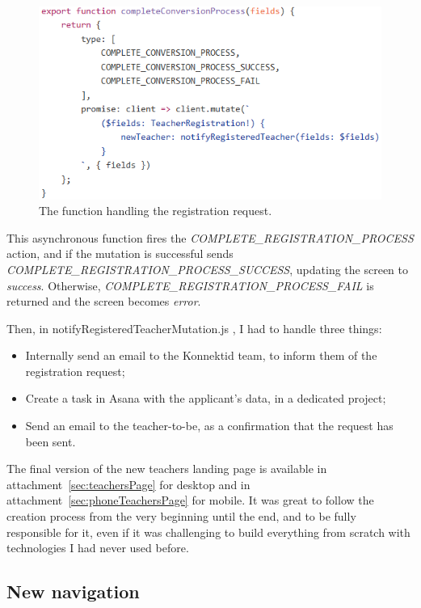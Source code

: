  \begin{figure}[H]
    \centering
    \includegraphics{figure/completeRegistration.png}
    \caption{The function handling the registration request.}
    \label{fig:completeRegistration}
\end{figure}

This asynchronous function fires the \textit{COMPLETE\_REGISTRATION\_PROCESS} action, and if the mutation is successful sends \textit{COMPLETE\_REGISTRATION\_PROCESS\_SUCCESS}, updating the screen to \textit{success}. Otherwise, \textit{COMPLETE\_REGISTRATION\_PROCESS\_FAIL} is returned and the screen becomes \textit{error}.

Then, in \guillemotleft{} notifyRegisteredTeacherMutation.js \guillemotright{}, I had to handle three things:
\begin{itemize}[noitemsep]
    \item Internally send an email to the Konnektid team, to inform them of the registration request;
    \item Create a task in Asana with the applicant's data, in a dedicated project;
    \item Send an email to the teacher-to-be, as a confirmation that the request has been sent.
\end{itemize}

The final version of the new teachers landing page is available in {\sc attachment}~\ref{sec:teachersPage} for desktop and in {\sc attachment}~\ref{sec:phoneTeachersPage} for mobile. It was great to follow the creation process from the very beginning until the end, and to be fully responsible for it, even if it was challenging to build everything from scratch with technologies I had never used before.

\subsection{New navigation}
\label{ssec:new_nav}

